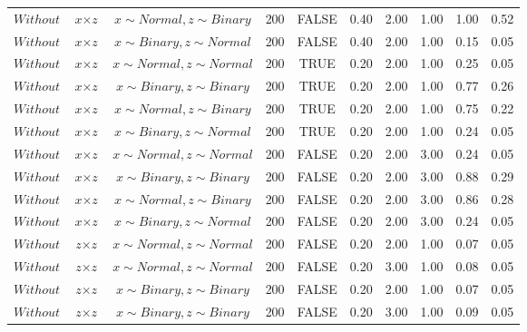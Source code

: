 \begin{longtable}{lccccccccc}
  $Without$ & $\textit{x} \times \textit{z}$ & $\textit{x} \sim Normal, \textit{z} \sim Binary$ & 200 & FALSE & 0.40 & 2.00 & 1.00 & 1.00 & 0.52 \\ 
  $Without$ & $\textit{x} \times \textit{z}$ & $\textit{x} \sim Binary, \textit{z} \sim Normal$ & 200 & FALSE & 0.40 & 2.00 & 1.00 & 0.15 & 0.05 \\ 
  $Without$ & $\textit{x} \times \textit{z}$ & $\textit{x} \sim Normal , \textit{z} \sim Normal$ & 200 & TRUE & 0.20 & 2.00 & 1.00 & 0.25 & 0.05 \\ 
  $Without$ & $\textit{x} \times \textit{z}$ & $\textit{x} \sim Binary, \textit{z} \sim Binary$ & 200 & TRUE & 0.20 & 2.00 & 1.00 & 0.77 & 0.26 \\ 
  $Without$ & $\textit{x} \times \textit{z}$ & $\textit{x} \sim Normal, \textit{z} \sim Binary$ & 200 & TRUE & 0.20 & 2.00 & 1.00 & 0.75 & 0.22 \\ 
  $Without$ & $\textit{x} \times \textit{z}$ & $\textit{x} \sim Binary, \textit{z} \sim Normal$ & 200 & TRUE & 0.20 & 2.00 & 1.00 & 0.24 & 0.05 \\ 
  $Without$ & $\textit{x} \times \textit{z}$ & $\textit{x} \sim Normal , \textit{z} \sim Normal$ & 200 & FALSE & 0.20 & 2.00 & 3.00 & 0.24 & 0.05 \\ 
  $Without$ & $\textit{x} \times \textit{z}$ & $\textit{x} \sim Binary, \textit{z} \sim Binary$ & 200 & FALSE & 0.20 & 2.00 & 3.00 & 0.88 & 0.29 \\ 
  $Without$ & $\textit{x} \times \textit{z}$ & $\textit{x} \sim Normal, \textit{z} \sim Binary$ & 200 & FALSE & 0.20 & 2.00 & 3.00 & 0.86 & 0.28 \\ 
  $Without$ & $\textit{x} \times \textit{z}$ & $\textit{x} \sim Binary, \textit{z} \sim Normal$ & 200 & FALSE & 0.20 & 2.00 & 3.00 & 0.24 & 0.05 \\ 
  $Without$ & $\textit{z} \times \textit{z}$ & $\textit{x} \sim Normal , \textit{z} \sim Normal$ & 200 & FALSE & 0.20 & 2.00 & 1.00 & 0.07 & 0.05 \\ 
  $Without$ & $\textit{z} \times \textit{z}$ & $\textit{x} \sim Normal , \textit{z} \sim Normal$ & 200 & FALSE & 0.20 & 3.00 & 1.00 & 0.08 & 0.05 \\ 
  $Without$ & $\textit{z} \times \textit{z}$ & $\textit{x} \sim Binary, \textit{z} \sim Binary$ & 200 & FALSE & 0.20 & 2.00 & 1.00 & 0.07 & 0.05 \\ 
  $Without$ & $\textit{z} \times \textit{z}$ & $\textit{x} \sim Binary, \textit{z} \sim Binary$ & 200 & FALSE & 0.20 & 3.00 & 1.00 & 0.09 & 0.05 \\ 

\end{longtable}
